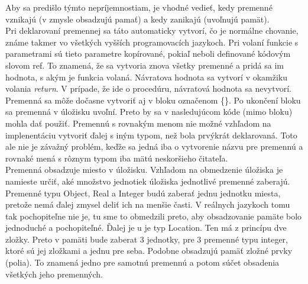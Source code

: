 Aby sa predišlo týmto nepríjemnostiam, je vhodné vedieť, kedy premenné vznikajú (v zmysle obsadzujú pamať) a kedy zanikajú (uvoľnujú pamät). \\
Pri deklarovaní premennej sa táto automaticky vytvorí, čo je normálne chovanie, známe takmer vo všetkých vyšších programovacích jazykoch. Pri volaní funkcie s parametrami sú tieto parametre kopírované, pokiaľ neboli definované kódovým slovom ref. To znamená, že sa vytvoria znova všetky premenné a pridá sa im hodnota, s akým je funkcia volaná. Návratova hodnota sa vytvorí v okamžiku volania {\it return}. V prípade, že ide o procedúru, návratová hodnota sa nevytvorí.
Premenná sa môže dočasne vytvoriť aj v bloku označenom \{\}. Po ukončení bloku sa premenná v úložisku uvoľní. Preto by sa v nasledujúcom kóde (mimo bloku) mohla dať použiť. Premennú s rovnakým menom nie možné vzhľadom na implenentáciu vytvoriť ďalej s iným typom, než bola prvýkrát deklarovaná. Toto ale nie je závažný problém, keďže sa jedná iba o vytvorenie názvu pre premennú a rovnaké mená s rôznym typom iba mätú neskoršieho čitateľa. \\

Premenná obsadzuje miesto v úložisku. Vzhľadom na obmedzenie úložiska je namieste určiť, aké množstvo jednotiek úložiska jednotlivé premenné zaberajú. Premenné typu Object, Real a Integer budú zaberať jednu jednotku miesta, pretože nemá ďalej zmysel deliť ich na menšie časti. V reálnych jazykoch tomu tak pochopiteľne nie je, tu sme to obmedzili preto, aby obsadzovanie pamäte bolo jednoduché a pochopiteľné. Ďalej je u je typ Location. Ten má z princípu dve zložky. Preto v pamäti bude zaberat 3 jednotky, pre 3 premenné typu integer, ktoré sú jej zložkami a jednu pre seba. Podobne obsadzujú pamäť zložné prvky (polia). To znamená jedno pre samotnú premennú a potom súčet obsadenia všetkých jeho premenných. \\%

